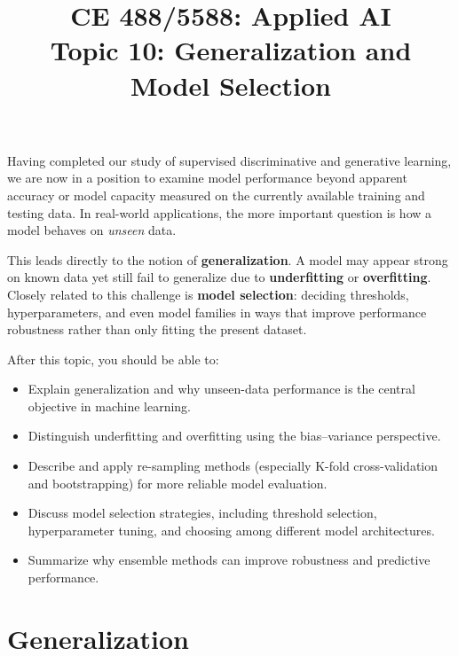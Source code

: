 \documentclass[12pt]{article}
\begin{document}
\doublespacing	

\title{CE 488/5588: Applied AI\\ \large Topic 10: Generalization and Model Selection}
\author{}
\date{}
\maketitle

Having completed our study of supervised discriminative and generative learning, we are now in a position to examine model performance beyond apparent accuracy or model capacity measured on the currently available training and testing data. In real-world applications, the more important question is how a model behaves on \emph{unseen} data.

This leads directly to the notion of \textbf{generalization}. A model may appear strong on known data yet still fail to generalize due to \textbf{underfitting} or \textbf{overfitting}. Closely related to this challenge is \textbf{model selection}: deciding thresholds, hyperparameters, and even model families in ways that improve performance robustness rather than only fitting the present dataset.

After this topic, you should be able to:
\begin{itemize}
    \item Explain generalization and why unseen-data performance is the central objective in machine learning.
    \item Distinguish underfitting and overfitting using the bias--variance perspective.
    \item Describe and apply re-sampling methods (especially K-fold cross-validation and bootstrapping) for more reliable model evaluation.
    \item Discuss model selection strategies, including threshold selection, hyperparameter tuning, and choosing among different model architectures.
    \item Summarize why ensemble methods can improve robustness and predictive performance.
\end{itemize}

\section{Generalization}
\end{document}
